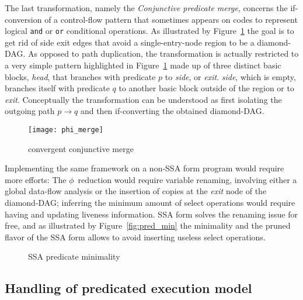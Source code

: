 The last transformation, namely the \emph{Conjunctive predicate merge}, concerns the if-conversion of a control-flow pattern that sometimes appears on codes to represent logical \texttt{and} or \texttt{or} conditional operations. 
As illustrated by Figure~\ref{fig:phi_merge} the goal is to get rid of side exit edges that avoid a single-entry-node region to be a diamond-DAG. 
As opposed to path duplication, the transformation is actually restricted to a very simple pattern highlighted in Figure~\ref{fig:phi_merge} made up of three distinct basic blocks, \textit{head}, that branches with predicate $p$ to \textit{side}, or \textit{exit}. 
\textit{side}, which is empty, branches itself with predicate $q$ to another basic block outside of the region or to \textit{exit}. 
Conceptually the transformation can be understood as first isolating the outgoing path $p\rightarrow q$ and then if-converting the obtained diamond-DAG.

\begin{figure}[h]
  \texttt{[image: phi\_merge]}
  \caption{\label{fig:phi_merge}convergent conjunctive merge} 
\end{figure}

Implementing the same framework on a non-SSA form program would require more efforts: 
The $\phi$~reduction would require variable renaming, involving either a global data-flow analysis or the insertion of copies at the \textit{exit} node of the diamond-DAG; 
inferring the minimum amount of {select} operations would require having and updating liveness information. 
SSA form solves the renaming issue for free, and as illustrated by Figure~\ref{fig:pred_min} the minimality and the pruned flavor of the SSA form allows to avoid inserting useless {select} operations.

\begin{figure}[h]
\centering
  \hfill
\caption{\label{fig:pred_min} SSA predicate minimality}
\label{fig:minimality}
\end{figure}

\subsection{Handling of predicated execution model}

